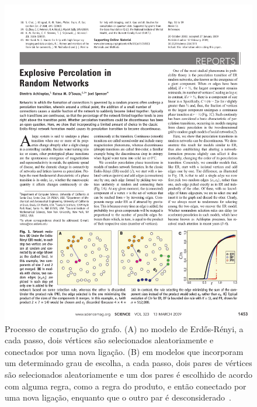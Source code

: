 \begin{figure}
 \centering
 \includegraphics[width=14cm]{img/ErdosProduct.pdf}
 \caption{Processo de construção do grafo. (A) no modelo de Erdős-Rényi, a cada passo, dois vértices são selecionados aleatoriamente e conectados por uma nova ligação. (B) em modelos que incorporam um determinado grau de escolha, a cada passo, dois pares de vértices são selecionados aleatoriamente e um dos pares é escolhido de acordo com alguma regra, como a regra do produto, e então conectado por uma nova ligação, enquanto que o outro par é desconsiderado~\cite{Achlioptas}.}
\label{fig.ErdosProduct}
\end{figure}

